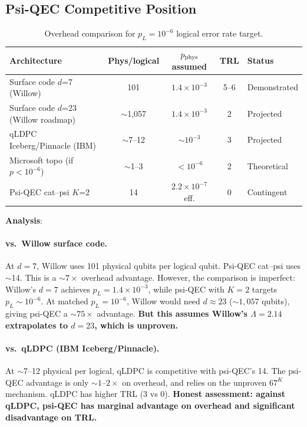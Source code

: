 \documentclass[11pt]{article}
\theoremstyle{definition}
\theoremstyle{remark}
\newcommand{\ee}[1]{\times 10^{#1}}
\begin{document}
\subsection{Psi-QEC Competitive Position}

\begin{table}[h]
\caption{Overhead comparison for $p_L = 10^{-6}$ logical error rate target.}
\label{tab:overhead-comparison}
\begin{tabular}{@{}lcccl@{}}
\toprule
Architecture & Phys/logical & $p_{\rm phys}$ assumed & TRL & Status \\
\midrule
Surface code $d$=7 (Willow) & 101 & $1.4\ee{-3}$ & 5--6 & Demonstrated \\
Surface code $d$=23 (Willow roadmap) & $\sim$1,057 & $1.4\ee{-3}$ & 2 & Projected \\
qLDPC Iceberg/Pinnacle (IBM) & $\sim$7--12 & $\sim 10^{-3}$ & 3 & Projected \\
Microsoft topo (if $p < 10^{-6}$) & $\sim$1--3 & $<10^{-6}$ & 2 & Theoretical \\
Psi-QEC cat--psi $K$=2 & 14 & $2.2\ee{-7}$ eff. & 0 & Contingent \\
\bottomrule
\end{tabular}
\end{table}

\textbf{Analysis}:

\paragraph{vs.\ Willow surface code.}
At $d=7$, Willow uses 101 physical qubits per logical qubit.  Psi-QEC
cat--psi uses $\sim$14.  This is a $\sim 7\times$ overhead advantage.
However, the comparison is imperfect: Willow's $d=7$ achieves $p_L =
1.4\ee{-3}$, while psi-QEC with $K=2$ targets $p_L \sim 10^{-6}$.
At matched $p_L = 10^{-6}$, Willow would need $d \approx 23$
($\sim 1,057$ qubits), giving psi-QEC a $\sim 75\times$ advantage.
\textbf{But this assumes Willow's $\Lambda = 2.14$ extrapolates to
$d=23$, which is unproven.}

\paragraph{vs.\ qLDPC (IBM Iceberg/Pinnacle).}
At $\sim$7--12 physical per logical, qLDPC is competitive with psi-QEC's 14.
The psi-QEC advantage is only $\sim 1$--$2\times$ on overhead, and relies
on the unproven $67^K$ mechanism.  qLDPC has higher TRL (3 vs 0).
\textbf{Honest assessment: against qLDPC, psi-QEC has marginal advantage
on overhead and significant disadvantage on TRL.}
\end{document}
